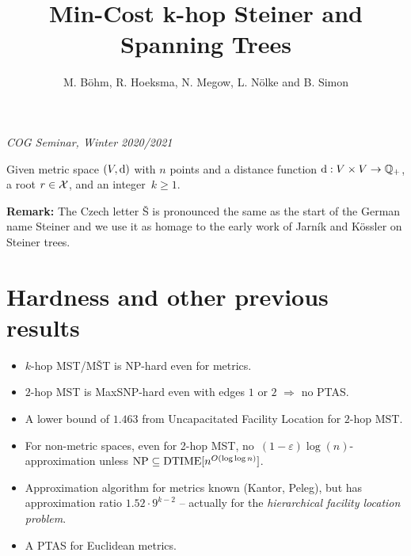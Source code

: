 \newcommand{\dir}[1]{{\bm{#1}}}


\long{}


\begin{multicols}{3}

  \title{Min-Cost k-hop Steiner and Spanning Trees}
\author{M. Böhm, R. Hoeksma, N. Megow, L. Nölke and B. Simon}
\centerline{\textit{COG Seminar, Winter 2020/2021}}

Given metric space $(V,\mathrm{d})$ with $n$ points and a distance function $\mathrm{d}: V\times V \rightarrow \mathbb{Q}_+$, a root $r\in \mathcal{X}$, and an integer~$k\geq 1$.



\textbf{Remark:} The Czech letter Š is pronounced the same as the
start of the German name Steiner and we use it as homage to the early
work of Jarník and Kössler on Steiner trees.

\section{Hardness and other previous results}

\begin{itemize}
\item $k$-hop MST/MŠT is NP-hard even for metrics.
\item $2$-hop MST is MaxSNP-hard even with edges $1$ or $2$ $\Rightarrow$ no PTAS.
\item A lower bound of $1.463$ from Uncapacitated Facility Location for $2$-hop MST.
\item For non-metric spaces, even for 2-hop MST, no~$(1-\varepsilon)\log(n)$-approximation unless $\textrm{NP} \subseteq \text{DTIME}[n^{O(\log\log n)}]$.
\item Approximation algorithm for metrics known (Kantor, Peleg), but has approximation ratio $1.52\!\cdot\! 9^{k-2}$ -- actually for the \emph{hierarchical facility location problem}.
\item A PTAS for Euclidean metrics.
\end{itemize}


\end{multicols}
